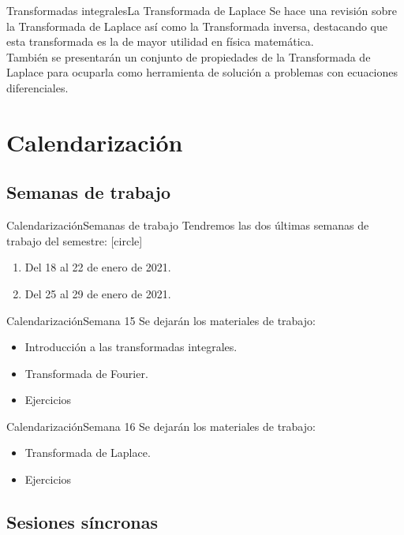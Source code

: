 \documentclass[10pt]{beamer}
\begin{document}
\begin{frame}{Transformadas integrales}{La Transformada de Laplace}
Se hace una revisión sobre la Transformada de Laplace así como la Transformada inversa, destacando que esta transformada es la de mayor utilidad en física matemática.
\\
\bigskip
\pause
También se presentarán un conjunto de propiedades de la Transformada de Laplace para ocuparla como herramienta de solución a problemas con ecuaciones diferenciales.
\end{frame}
\section{Calendarización}
\subsection{Semanas de trabajo}

\begin{frame}{Calendarización}{Semanas de trabajo}
Tendremos las dos últimas semanas de trabajo del semestre:
[circle]
\begin{enumerate}[<+->]
\item Del 18 al 22 de enero de 2021.
\item Del 25 al 29 de enero de 2021.
\end{enumerate}
\end{frame}
\begin{frame}{Calendarización}{Semana 15}
Se dejarán los materiales de trabajo:
\begin{itemize}
\item Introducción a las transformadas integrales.
\item Transformada de Fourier.
\item Ejercicios
\end{itemize}
\end{frame}
\begin{frame}{Calendarización}{Semana 16}
Se dejarán los materiales de trabajo:
\begin{itemize}
\item Transformada de Laplace.
\item Ejercicios
\end{itemize}
\end{frame}
\subsection{Sesiones síncronas}
\end{document}
